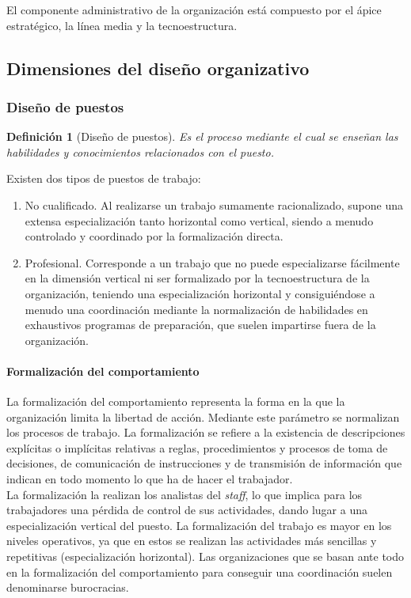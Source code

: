 \documentclass[12pt]{article}
\theoremstyle{definition_wo_parentheses}
\newtheorem{definicion}{Definición}[section]
\begin{document}
	El componente administrativo de la organización está compuesto por el ápice estratégico, la línea media y la tecnoestructura.


\subsection{Dimensiones del diseño organizativo}

\subsubsection{Diseño de puestos}

\begin{definicion}[Diseño de puestos]
Es el proceso mediante el cual se enseñan las habilidades y conocimientos relacionados con el puesto.
\end{definicion}

	Existen dos tipos de puestos de trabajo:

\begin{enumerate}
\item No cualificado. Al realizarse un trabajo sumamente racionalizado, supone una extensa especialización tanto horizontal como vertical, siendo a menudo controlado y coordinado por la formalización directa.

\item Profesional. Corresponde a un trabajo que no puede especializarse fácilmente en la dimensión vertical ni ser formalizado por la tecnoestructura de la organización, teniendo una especialización horizontal y consiguiéndose a menudo una coordinación mediante la normalización de habilidades en exhaustivos programas de preparación, que suelen impartirse fuera de la organización.
\end{enumerate}

\paragraph{Formalización del comportamiento} La formalización del comportamiento representa la forma en la que la organización limita la libertad de acción. Mediante este parámetro se normalizan los procesos de trabajo. La formalización se refiere a la existencia de descripciones explícitas o implícitas relativas a reglas, procedimientos y procesos de toma de decisiones, de comunicación de instrucciones y de transmisión de información que indican en todo momento lo que ha de hacer el trabajador.\\
La formalización la realizan los analistas del \textit{staff}, lo que implica para los trabajadores una pérdida de control de sus actividades, dando lugar a una especialización vertical del puesto. La formalización del trabajo es mayor en los niveles operativos, ya que en estos se realizan las actividades más sencillas y repetitivas (especialización horizontal). Las organizaciones que se basan ante todo en la formalización del comportamiento para conseguir una coordinación suelen denominarse burocracias.
\end{document}
